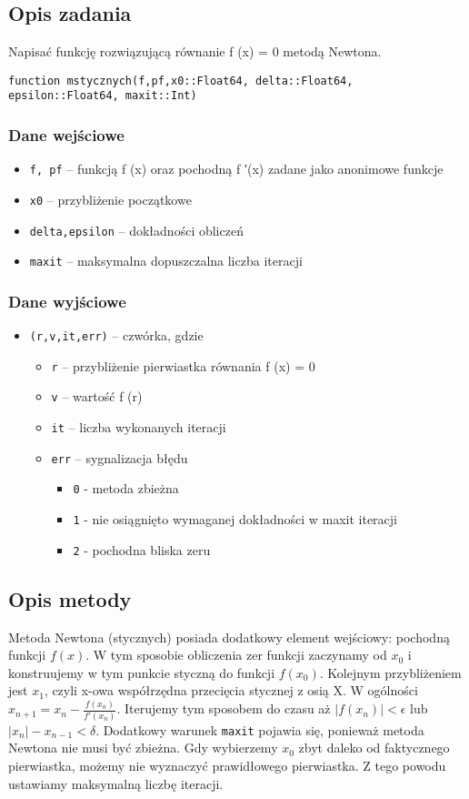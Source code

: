 \documentclass{article}
\begin{document}
\subsection*{Opis zadania}
Napisać funkcję rozwiązującą równanie f (x) = 0 metodą Newtona.

\texttt{function mstycznych(f,pf,x0::Float64, delta::Float64, epsilon::Float64, maxit::Int)}
\subsubsection*{Dane wejściowe}
    \begin{itemize}
        \item \texttt{f, pf} – funkcją f (x) oraz pochodną f ′(x) zadane jako anonimowe funkcje
        \item \texttt{x0} – przybliżenie początkowe
        \item \texttt{delta,epsilon} – dokładności obliczeń
        \item \texttt{maxit} – maksymalna dopuszczalna liczba iteracji
    \end{itemize}
\subsubsection*{Dane wyjściowe}
    \begin{itemize}
        \item \texttt{(r,v,it,err)} – czwórka, gdzie
        \begin{itemize}
            \item \texttt{r} – przybliżenie pierwiastka równania f (x) = 0
            \item \texttt{v} – wartość f (r)
            \item \texttt{it} – liczba wykonanych iteracji
            \item \texttt{err} – sygnalizacja błędu
                \begin{itemize}
                    \item \texttt{0} - metoda zbieżna
                    \item \texttt{1} - nie osiągnięto wymaganej dokładności w maxit iteracji
                    \item \texttt{2} - pochodna bliska zeru
                \end{itemize}
        \end{itemize}
    \end{itemize}
\subsection*{Opis metody}
Metoda Newtona (stycznych) posiada dodatkowy element wejściowy: pochodną funkcji $f(x)$. 
W tym sposobie obliczenia zer funkcji zaczynamy od $x_0$ i konstruujemy w tym punkcie styczną do funkcji $f(x_0)$. Kolejnym przybliżeniem jest $x_1$, czyli x-owa współrzędna przecięcia stycznej z osią X. W ogólności $x_{n+1}=x_n-\frac{f(x_n)}{f'(x_n)}$. Iterujemy tym sposobem do czasu aż $|f(x_n)|<\epsilon$ lub $|x_n|-x_{n-1}<\delta$. Dodatkowy warunek \texttt{maxit} pojawia się, ponieważ metoda Newtona nie musi być zbieżna. Gdy wybierzemy $x_0$ zbyt daleko od faktycznego pierwiastka, możemy nie wyznaczyć prawidłowego pierwiastka. Z tego powodu ustawiamy maksymalną liczbę iteracji. 
\end{document}
